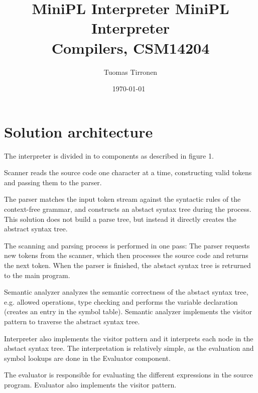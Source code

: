 \documentclass[fleqn]{article}
\begin{document}
\title{MiniPL Interpreter}

\title{%
    MiniPL Interpreter \\
    \large Compilers, CSM14204
}

\author{Tuomas Tirronen}

\date{\today \ \currenttime}

\maketitle
\newpage

\tableofcontents

\newpage

\section{Solution architecture}

The interpreter is divided in to components as described in figure 1.
\par
Scanner reads the source code one character at a time, constructing valid tokens and passing them to the parser.
\par
The parser matches the input token stream against the syntactic rules of the context-free grammar, and constructs an abstact syntax tree during the process.
This solution does not build a parse tree, but instead it directly creates the abstract syntax tree.
\par
The scanning and parsing process is performed in one pass: The parser requests new tokens from the scanner, which then processes the source code and returns the next token.
When the parser is finished, the abstact syntax tree is retrurned to the main program.
\par
Semantic analyzer analyzes the semantic correctness of the abstact syntax tree, e.g. allowed operations, type checking and performs the variable declaration (creates an entry in the symbol table).
Semantic analyzer implements the visitor pattern to traverse the abstract syntax tree.
\par
Interpreter also implements the visitor pattern and it interprets each node in the abstact syntax tree.
The interpretation is relatively simple, as the evaluation and symbol lookups are done in the Evaluator component.
\par
The evaluator is responsible for evaluating the different expressions in the source program. Evaluator also implements the visitor pattern.
\end{document}
